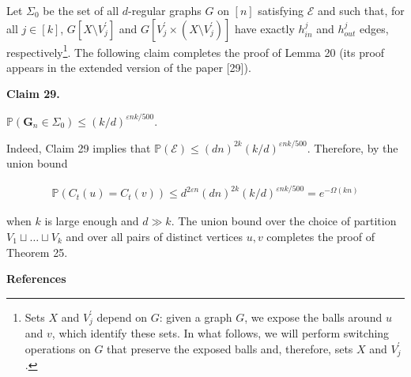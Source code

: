 Let $\Sigma_{0}$ be the set of all $d$-regular graphs $G$ on $[n]$ satisfying $\mathcal{E}$ and such that, for all $j\in[k]$, $G[X\setminus V^{\prime}_{j}]$ and $G[V^{\prime}_{j}\times(X\setminus V^{\prime}_{j})]$ have exactly $h^{j}_{in}$ and $h^{j}_{out}$ edges, respectively\footnote{Sets $X$ and $V^{\prime}_{j}$ depend on $G$: given a graph $G$, we expose the balls around $u$ and $v$, which identify these sets. In what follows, we will perform switching operations on $G$ that preserve the exposed balls and, therefore, sets $X$ and $V^{\prime}_{j}$.}. The following claim completes the proof of Lemma 20 (its proof appears in the extended version of the paper [29]).\par





\par\medskip\noindent\textbf{
Claim 29. 
}\par



$\mathbb{P}(\mathbf{G}_{n}\in\Sigma_{0})\leq(k/d)^{\varepsilon nk/500}$.\par






Indeed, Claim 29 implies that $\mathbb{P}(\mathcal{E})\leq(dn)^{2k}(k/d)^{\varepsilon nk/500}$. Therefore, by the union bound\par


\[\begin{gathered}
\mathbb{P}(C_{t}(u)=C_{t}(v))\leq d^{2\varepsilon n}(dn)^{2k}(k/d)^{\varepsilon nk/500}=e^{-\Omega(kn)}
\end{gathered}\]


when $k$ is large enough and $d\gg k$. The union bound over the choice of partition $V_{1}\sqcup\ldots\sqcup V_{k}$ and over all pairs of distinct vertices $u,v$ completes the proof of Theorem 25.\par






\par\medskip\noindent\textbf{References}\par



